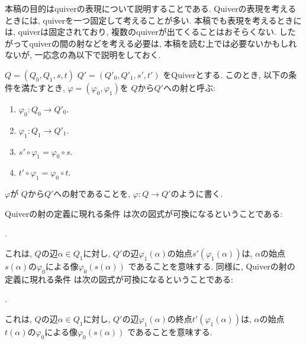 \begin{remark}
  本稿の目的はquiverの表現について説明することである.
  Quiverの表現を考えるときには,
  quiverを一つ固定して考えることが多い.
  本稿でも表現を考えるときには,
  quiverは固定されており,
  複数のquiverが出てくることはおそらくない.
  したがってquiverの間の射などを考える必要は,
  本稿を読む上では必要ないかもしれないが,
  一応念の為以下で説明をしておく.
\end{remark}


\begin{definition}
  $Q=(Q_0,Q_1,s,t)$
  $Q'=(Q'_0,Q'_1,s',t')$
  をQuiverとする.
  このとき,
  以下の条件を満たすとき,
  $\varphi=(\varphi_0,\varphi_1)$を
  $Q$から$Q'$への射と呼ぶ:
  \begin{enumerate}
  \item $\varphi_0\colon Q_0\to Q'_0$.
  \item $\varphi_1\colon Q_1\to Q'_1$.
  \item
    \label{def:item:quiver:hom:s}
    $s'\circ\varphi_1=\varphi_0\circ s$.
  \item $t'\circ\varphi_1=\varphi_0\circ t$.
  \end{enumerate}
    \label{def:item:quiver:hom:t}
  $\varphi$が
  $Q$から$Q'$への射であることを,
  $\varphi\colon Q\to Q'$のように書く.
\end{definition}
Quiverの射の定義に現れる条件
は次の図式が可換になるということである:
\begin{center}
  .
\end{center}
これは,
$Q$の辺$\alpha\in Q_1$に対し,
$Q'$の辺$\varphi_1(\alpha)$の始点$s'(\varphi_1(\alpha))$は,
$\alpha$の始点$s(\alpha)$の$\varphi_0$による像$\varphi_0(s(\alpha))$
であることを意味する.
同様に, Quiverの射の定義に現れる条件
は次の図式が可換になるということである:
\begin{center}
  .
\end{center}
これは,
$Q$の辺$\alpha\in Q_1$に対し,
$Q'$の辺$\varphi_1(\alpha)$の終点$t'(\varphi_1(\alpha))$は,
$\alpha$の始点$t(\alpha)$の$\varphi_0$による像$\varphi_0(s(\alpha))$
であることを意味する.

